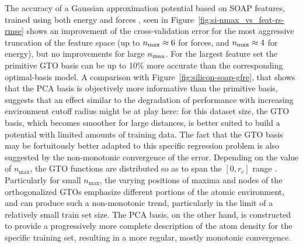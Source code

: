 The accuracy of a Gaussian approximation potential based on SOAP features, trained using both energy and forces
, seen in Figure~\ref{fig:si-nmax_vs_feat-rs-rmse} shows an improvement of the cross-validation error for the most aggressive truncation of the feature space (up to $n_\mathrm{max}\approx 6$ for forces, and $n_\mathrm{max}\approx 4$ for energy), but no improvements for large $n_\mathrm{max}$. 
For the largest feature set the primitive GTO basis can be up to 10\% more accurate than the corresponding optimal-basis model.
A comparison with Figure~\ref{fig:silicon-soap-gfre}, that shows that the PCA basis is objectively more informative than the primitive basis, suggests that an effect similar to the degradation of performance with increasing environment cutoff radius might be at play here: for this dataset size, the GTO basis, which becomes smoother for large distances, is better suited to build a potential with limited amounts of training data.
The fact that the GTO basis may be fortuitously better adapted to this specific regression problem is also suggested by the non-monotonic convergence of the error. Depending on the value of $n_\text{max}$, the GTO functions are distributed so as to span the $[0, r_c]$ range
.
Particularly for small $n_\text{max}$, the varying positions of maxima and nodes of the orthogonalized GTOs emphasize different portions of the atomic environment, and can produce such a non-monotonic trend, particularly in the limit of a relatively small train set size. 
The PCA basis, on the other hand, is constructed to provide a progressively more complete description of the atom density for the specific training set, resulting in a more regular, mostly monotonic convergence.

